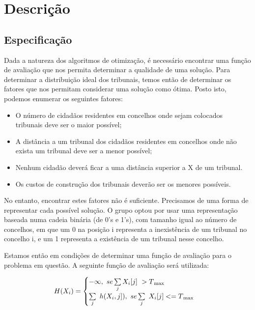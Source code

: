 \documentclass[11pt,a4paper,reqno]{article}
\numberwithin{equation}{section}
\begin{document}

\newpage

\section{Descrição} 
\subsection{Especificação} \label{introduction}

Dada a natureza dos algoritmos de otimização, é necessário encontrar uma função de avaliação que nos permita determinar a qualidade de uma solução. Para determinar a distribuição ideal dos tribunais, temos então de determinar os fatores que nos permitam considerar uma solução como ótima. Posto isto, podemos enumerar os seguintes fatores:

\begin{itemize}
\item O número de cidadãos residentes em concelhos onde sejam colocados tribunais deve ser o maior possível;
\item A distância a um tribunal dos cidadãos residentes em concelhos onde não exista um tribunal deve ser a menor possível;
\item Nenhum cidadão deverá ficar a uma distância superior a X de um tribunal.
\item Os custos de construção dos tribunais deverão ser os menores possíveis.
\end{itemize}

No entanto, encontrar estes fatores não é suficiente. Precisamos de uma forma de representar cada possível solução. O grupo optou por usar uma representação baseada numa cadeia binária (de 0's e 1's), com tamanho igual ao número de concelhos, em que um 0 na posição i representa a inexistência de um tribunal no concelho i, e um 1 representa a existência de um tribunal nesse concelho.

Estamos então em condições de determinar uma função de avaliação para o problema em questão. A seguinte função de avaliação será utilizada:

\begin{equation}
    H(X_i) = \begin{cases}
    -\infty ,\ se \sum\limits_{j}X_i[j]\ > T\textsubscript{max} \\
    \sum\limits_{j}\ h(X_i, j]), \ se \sum\limits_{j}\ X_i[j] <= T\textsubscript{max}\\
    \end{cases}
\end{equation}
\end{document}
